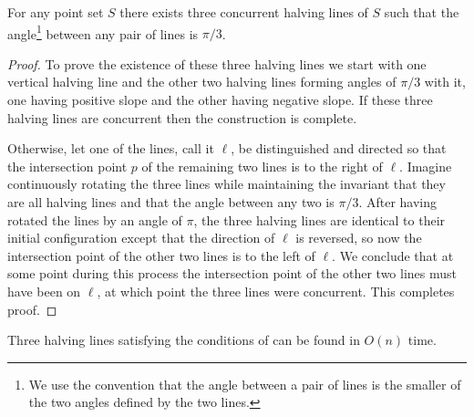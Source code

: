 \documentclass[lotsofwhite]{patmorin}
\begin{document}
\begin{lem}
For any point set $S$ there exists three concurrent halving lines 
of $S$ such that the angle\footnote{We use the convention that
the angle between a pair of lines is the smaller of the two angles
defined by the two lines.} between any pair of lines is $\pi/3$.
\end{lem}

\begin{proof}
To prove the existence of these three halving lines we start with one
vertical halving line and the other two halving lines forming angles
of $\pi/3$ with it, one having positive slope and the other
having negative slope.  If these three halving lines are concurrent
then the construction is complete. 

Otherwise, let one of the lines, call it $\ell$, be distinguished and
directed so that the intersection point $p$ of the remaining two lines
is to the right of $\ell$.  Imagine continuously rotating the three
lines while maintaining the invariant that they are all halving lines
and that the angle between any two is $\pi/3$.  After having rotated
the lines by an angle of $\pi$, the three halving lines are identical
to their initial configuration except that the direction of $\ell$ is
reversed, so now the intersection point of the other two lines is to
the left of $\ell$.  We conclude that at some point during this
process the intersection point of the other two lines must have been
on $\ell$, at which point the three lines were concurrent.  This
completes proof.  
\end{proof}

\begin{lem}
Three halving lines satisfying the conditions of 
can be found in $O(n)$ time.
\end{lem}
\end{document}
